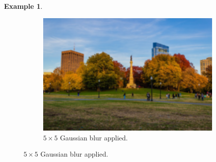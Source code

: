 \documentclass{article}
\theoremstyle{definition}
\newtheorem{example}{Example}[section]
\theoremstyle{remark}
\theoremstyle{definition}
\begin{document}
\begin{example}
\begin{figure}[hbt!]
        \begin{subfigure}[b]{0.32\textwidth}
        \centering
            \includegraphics[width=\textwidth]{img/OpenCV/Gaussian_Blur.png}
            \caption{$5 \times 5$ Gaussian blur applied. }
            \label{fig:normal_blur_image}
        \end{subfigure}
        

\end{figure}
\end{example}
\end{document}
